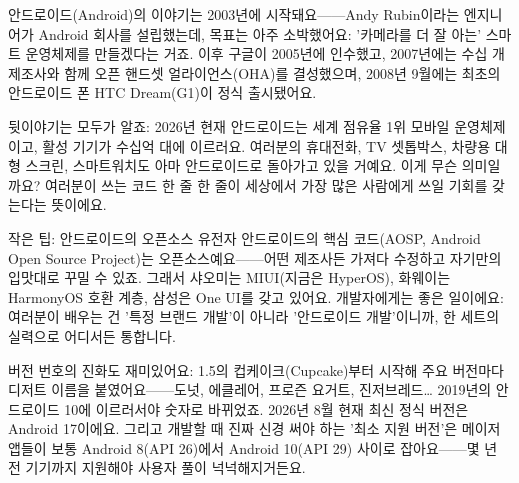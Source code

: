 


안드로이드(Android)의 이야기는 2003년에 시작돼요——Andy Rubin이라는 엔지니어가 Android 회사를 설립했는데, 목표는 아주 소박했어요: '카메라를 더 잘 아는' 스마트 운영체제를 만들겠다는 거죠. 이후 구글이 2005년에 인수했고, 2007년에는 수십 개 제조사와 함께 오픈 핸드셋 얼라이언스(OHA)를 결성했으며, 2008년 9월에는 최초의 안드로이드 폰 HTC Dream(G1)이 정식 출시됐어요.

뒷이야기는 모두가 알죠: 2026년 현재 안드로이드는 세계 점유율 1위 모바일 운영체제이고, 활성 기기가 수십억 대에 이르러요. 여러분의 휴대전화, TV 셋톱박스, 차량용 대형 스크린, 스마트워치도 아마 안드로이드로 돌아가고 있을 거예요. 이게 무슨 의미일까요? 여러분이 쓰는 코드 한 줄 한 줄이 세상에서 가장 많은 사람에게 쓰일 기회를 갖는다는 뜻이에요.

\begin{tcbinfo}{작은 팁: 안드로이드의 오픈소스 유전자}
안드로이드의 핵심 코드(AOSP, Android Open Source Project)는 오픈소스예요——어떤 제조사든 가져다 수정하고 자기만의 입맛대로 꾸밀 수 있죠. 그래서 샤오미는 MIUI(지금은 HyperOS), 화웨이는 HarmonyOS 호환 계층, 삼성은 One UI를 갖고 있어요. 개발자에게는 좋은 일이에요: 여러분이 배우는 건 '특정 브랜드 개발'이 아니라 '안드로이드 개발'이니까, 한 세트의 실력으로 어디서든 통합니다.

\end{tcbinfo}

버전 번호의 진화도 재미있어요: 1.5의 컵케이크(Cupcake)부터 시작해 주요 버전마다 디저트 이름을 붙였어요——도넛, 에클레어, 프로즌 요거트, 진저브레드… 2019년의 안드로이드 10에 이르러서야 숫자로 바뀌었죠. 2026년 8월 현재 최신 정식 버전은 Android 17이에요. 그리고 개발할 때 진짜 신경 써야 하는 '최소 지원 버전'은 메이저 앱들이 보통 Android 8(API 26)에서 Android 10(API 29) 사이로 잡아요——몇 년 전 기기까지 지원해야 사용자 풀이 넉넉해지거든요.

